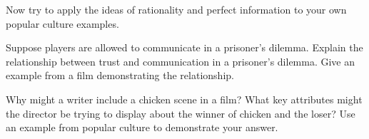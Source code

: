 Now try to apply the ideas of rationality and perfect information to your own popular culture examples.




\begin{writing}
Suppose players are allowed to communicate in a prisoner's dilemma. Explain the relationship between trust and communication in a prisoner's dilemma. Give an example from a film demonstrating the relationship.
\end{writing}

\begin{writing}
Why might a writer include a chicken scene in a film? What key attributes might the director be trying to display about the winner of chicken and the loser? Use an example from popular culture to demonstrate your answer.
\end{writing}







 